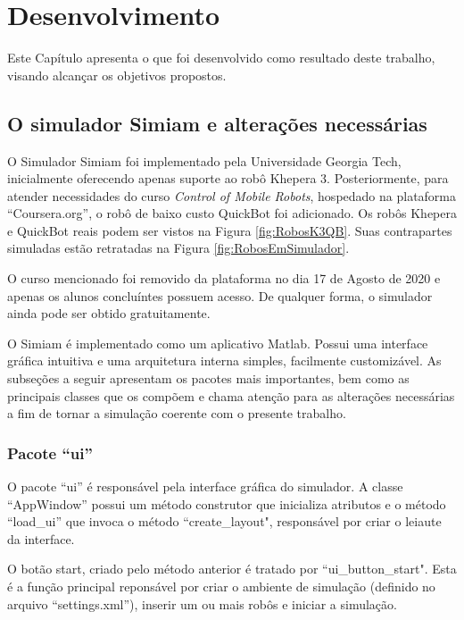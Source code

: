 \chapter{Desenvolvimento}
\vspace{-2.5 cm}

Este Capítulo apresenta o que foi desenvolvido como resultado deste trabalho,
visando alcançar os objetivos propostos.

\section{O simulador Simiam e alterações necessárias}

O Simulador Simiam foi implementado pela Universidade Georgia Tech, 
inicialmente oferecendo apenas suporte ao robô Khepera 3. Posteriormente, 
para atender necessidades do curso \textit{Control of Mobile Robots}, hospedado 
na plataforma ``Coursera.org'', o robô de baixo custo QuickBot foi adicionado. 
Os robôs Khepera e QuickBot reais podem ser vistos na Figura \ref{fig:RobosK3QB}. 
Suas contrapartes simuladas estão retratadas na Figura \ref{fig:RobosEmSimulador}.

O curso mencionado foi removido da plataforma no dia 17 de Agosto de 2020 e apenas
os alunos concluíntes possuem acesso. De qualquer forma, o simulador ainda pode ser
obtido gratuitamente.





O Simiam é implementado como um aplicativo Matlab. Possui uma interface
gráfica intuitiva e uma arquitetura interna simples, facilmente customizável. As
subseções a seguir apresentam os pacotes mais importantes, bem como as
principais classes que os compõem e chama atenção para as alterações necessárias
a fim de tornar a simulação coerente com o presente trabalho.

	\subsection{Pacote ``ui''}
	
	O pacote ``ui'' é responsável pela interface gráfica do simulador. A classe
	``AppWindow'' possui um método construtor que inicializa atributos e o
	método ``load\_ui'' que invoca o método ``create\_layout", responsável por
	criar o leiaute da interface.
	
	O botão start, criado pelo método anterior é tratado por ``ui\_button\_start".
	Esta é a função principal reponsável por criar o ambiente de simulação
	(definido no arquivo ``settings.xml''), inserir um ou mais robôs e iniciar a
	simulação.
	

